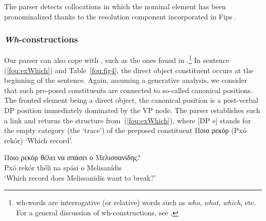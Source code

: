 \documentclass[output=paper]{langsci/langscibook}
\begin{document}
The parser detects collocations in which the nominal element has been pron\-ominalized thanks to the  resolution component incorporated in Fips \citep{wn13}. 


\subsubsection{\textit{Wh}-constructions}
Our parser can also cope with , such as the ones found in .\footnote{wh-words are interrogative (or relative) words such as \textit{who}, \textit{what}, \textit{which}, etc. For a general discussion of wh-constructions, see \citep{chomsky77}.} In sentence (\ref{fou:exWhich}) %
and Table~\ref{fou:fig4}, the direct object constituent occurs at the beginning of the sentence. Again, assuming a generative  analysis, we consider that such pre-posed constituents are connected to so-called canonical positions. The fronted element being a direct object, the canonical position is a post-verbal DP position immediately dominated by the VP node. The parser establishes such a link and returns the structure from~(\ref{fou:exWhich}), where [DP e] stands for the empty category (the `trace') of the preposed constituent {Ποιο ρεκόρ} (Pxó rekór) `Which record'. 

\ea\label{fou:exWhich}
\gll Ποιο ρεκόρ θέλει να σπάσει ο Μελισσανίδης? \\
Pxó rekór théli na spási o Melisanídis\\
{\small{}      }
\glt `Which record does Melissanidis want to break?'
\z

\end{document}
